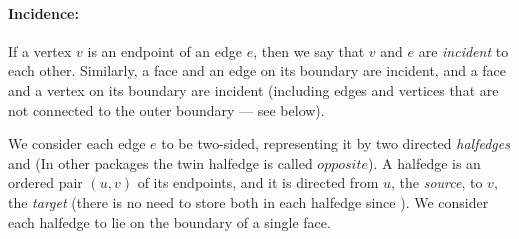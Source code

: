\paragraph{Incidence:}
If a vertex $v$ is an endpoint of an edge $e$, then we say that $v$
and $e$ are {\em incident} to each other. Similarly, a face and an
edge on its boundary are incident, and a face and a vertex on its
boundary are incident (including edges and vertices that are not connected 
to the outer boundary --- see below).

We consider each edge $e$ to be two-sided, representing it by two
directed {\em halfedges}  and 
(In other packages the twin halfedge is called $opposite$).  
A halfedge  is an ordered pair $(u,v)$ of its endpoints, and
it is directed from $u$, the {\em source}, to $v$, the {\em target} (there 
is no need to store both in each halfedge since 
%
).
We consider each halfedge to lie on the boundary of a single face.



